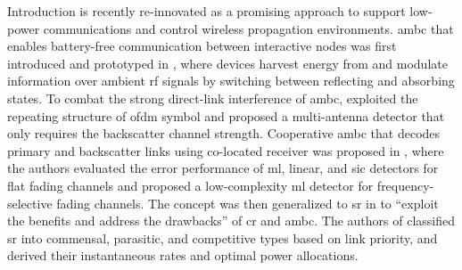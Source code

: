 \documentclass[journal]{IEEEtran}
\begin{document}
\begin{section}{Introduction}
	 is recently re-innovated as a promising approach to support low-power communications and control wireless propagation environments.
	\gls{ambc} that enables battery-free communication between interactive nodes was first introduced and prototyped in \cite{Liu2013b}, where devices harvest energy from and modulate information over ambient \gls{rf} signals by switching between reflecting and absorbing states.
	To combat the strong direct-link interference of \gls{ambc}, \cite{Yang2018d} exploited the repeating structure of \gls{ofdm} symbol and proposed a multi-antenna detector that only requires the backscatter channel strength.
	Cooperative \gls{ambc} that decodes primary and backscatter links using co-located receiver was proposed in \cite{Yang2018}, where the authors evaluated the error performance of \gls{ml}, linear, and \gls{sic} detectors for flat fading channels and proposed a low-complexity \gls{ml} detector for frequency-selective fading channels.
	The concept was then generalized to \gls{sr} in \cite{Liang2020} to ``exploit the benefits and address the drawbacks'' of \gls{cr} and \gls{ambc}.
	The authors of \cite{Guo2019b} classified \gls{sr} into commensal, parasitic, and competitive types based on link priority, and derived their instantaneous rates and optimal power allocations.

\end{section}
\end{document}
